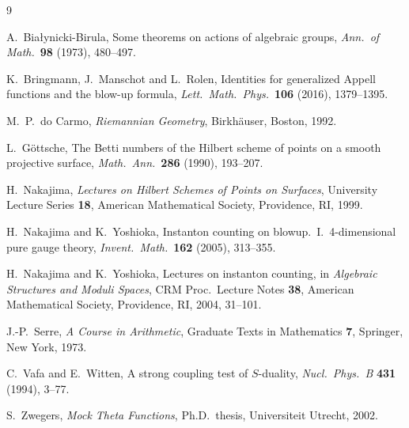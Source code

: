 \documentclass[11pt,a4paper]{article}
\theoremstyle{plain}
\theoremstyle{definition}
\theoremstyle{remark}
\begin{document}
\begin{thebibliography}{9}

A.~Bia{\l}ynicki-Birula,
Some theorems on actions of algebraic groups,
\textit{Ann.\ of Math.}\ \textbf{98} (1973), 480--497.

K.~Bringmann, J.~Manschot and L.~Rolen,
Identities for generalized Appell functions and the blow-up formula,
\textit{Lett.\ Math.\ Phys.}\ \textbf{106} (2016), 1379--1395.

M.~P.~do Carmo,
\textit{Riemannian Geometry},
Birkh\"auser, Boston, 1992.

L.~G\"ottsche,
The Betti numbers of the Hilbert scheme of points on a smooth
projective surface,
\textit{Math.\ Ann.}\ \textbf{286} (1990), 193--207.

H.~Nakajima,
\textit{Lectures on Hilbert Schemes of Points on Surfaces},
University Lecture Series \textbf{18}, American Mathematical Society,
Providence, RI, 1999.

H.~Nakajima and K.~Yoshioka,
Instanton counting on blowup.\ I.\ 4-dimensional pure gauge theory,
\textit{Invent.\ Math.}\ \textbf{162} (2005), 313--355.

H.~Nakajima and K.~Yoshioka,
Lectures on instanton counting,
in \textit{Algebraic Structures and Moduli Spaces},
CRM Proc.\ Lecture Notes \textbf{38}, American Mathematical Society,
Providence, RI, 2004, 31--101.

J.-P.~Serre,
\textit{A Course in Arithmetic},
Graduate Texts in Mathematics \textbf{7}, Springer, New York, 1973.

C.~Vafa and E.~Witten,
A strong coupling test of $S$-duality,
\textit{Nucl.\ Phys.\ B} \textbf{431} (1994), 3--77.

S.~Zwegers,
\textit{Mock Theta Functions},
Ph.D.\ thesis, Universiteit Utrecht, 2002.

\end{thebibliography}
\end{document}
